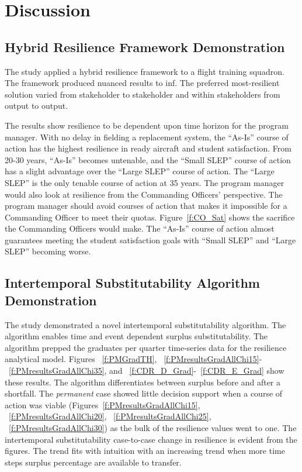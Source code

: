 \documentclass[preprint,12pt]{elsarticle}
\begin{document}
\section{Discussion}
\label{s:Disc}

\subsection{Hybrid Resilience Framework Demonstration}
The study applied a hybrid resilience framework to a flight training
squadron. The framework produced nuanced results to inf. The 
preferred most-resilient solution varied from stakeholder to
stakeholder and within stakeholders from output to output.

The results show resilience to be dependent upon time horizon for the
program manager. With no delay in fielding a replacement system, the
``As-Is'' course of action has the highest resilience in ready
aircraft and student satisfaction. From 20-30 years, ``As-Is'' becomes
untenable, and the ``Small SLEP'' course of action has a slight
advantage over the ``Large SLEP'' course of action. The
``Large SLEP'' is the only tenable course of action at 35 years. The
program manager would also look at resilience from the Commanding
Officers' perspective. The program manager should avoid courses of action that makes it impossible for
a Commanding Officer to meet their quotas. Figure~\ref{f:CO_Sat} shows
the sacrifice the Commanding Officers would make. The ``As-Is'' course
of action almost guarantees meeting the student satisfaction goals
with ``Small SLEP'' and ``Large SLEP'' becoming worse.

\subsection{Intertemporal Substitutability Algorithm Demonstration}

The study demonstrated a novel intertemporal substitutability
algorithm. The algorithm enables time and event dependent
surplus substitutability. The algorithm prepped the graduates per
quarter time-series data for the resilience analytical model. Figures
~\ref{f:PMGradTH},
~\ref{f:PMresultsGradAllChi15}-~\ref{f:PMresultsGradAllChi35},
and ~\ref{f:CDR_D_Grad}-~\ref{f:CDR_E_Grad} show these 
results. The algorithm differentiates between surplus before and after
a shortfall. The \emph{permanent} case showed little decision support
when a course of action was viable
(Figures~\ref{f:PMresultsGradAllChi15},
~\ref{f:PMresultsGradAllChi20},
~\ref{f:PMresultsGradAllChi25},
~\ref{f:PMresultsGradAllChi30}) as the bulk of the resilience
values went to one.  The intertemporal substitutability case-to-case
change in resilience is evident from the figures. The trend fits with
intuition with an increasing trend when more time steps 
surplus percentage are available to transfer.
\end{document}
